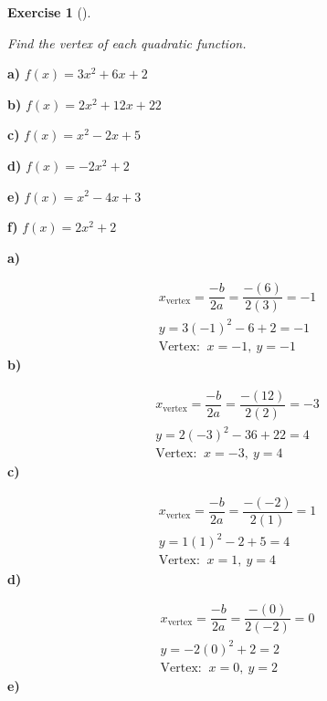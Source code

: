 \documentclass[
  letterpaper,
  DIV=11,
  numbers=noendperiod]{scrreprt}
\theoremstyle{definition}
\newtheorem{exercise}{Exercise}[chapter]
\theoremstyle{remark}
\begin{document}
\begin{exercise}[]\protect\hypertarget{exr-u7-25}{}\label{exr-u7-25}

\emph{Find the vertex of each quadratic function.}

\textbf{a)} \(\displaystyle f(x) = 3x^2 + 6x + 2\)

\textbf{b)} \(\displaystyle f(x) = 2x^2 + 12x + 22\)

\textbf{c)} \(\displaystyle f(x) = x^2 - 2x + 5\)

\textbf{d)} \(\displaystyle f(x) = -2x^2 + 2\)

\textbf{e)} \(\displaystyle f(x) = x^2 - 4x + 3\)

\textbf{f)} \(\displaystyle f(x) = 2x^2 + 2\)

\begin{tcolorbox}[enhanced jigsaw, opacitybacktitle=0.6, coltitle=black, arc=.35mm, colframe=quarto-callout-tip-color-frame, colback=white, bottomrule=.15mm, left=2mm, colbacktitle=quarto-callout-tip-color!10!white, titlerule=0mm, opacityback=0, title=\textcolor{quarto-callout-tip-color}{\faLightbulb}\hspace{0.5em}{🔍 View Solutions}, leftrule=.75mm, breakable, rightrule=.15mm, bottomtitle=1mm, toptitle=1mm, toprule=.15mm]

\textbf{a)}

\[
\begin{aligned}
x_{\text{vertex}} = \dfrac{-b}{2a} = \dfrac{-(6)}{2(3)} = -1 \\[4pt] y = 3(-1)^2 - 6 + 2 = -1 \\[4pt] \text{Vertex: }\ x=-1,\ y=-1
\end{aligned}
\] \textbf{b)}

\[
\begin{aligned}
x_{\text{vertex}} = \dfrac{-b}{2a} = \dfrac{-(12)}{2(2)} = -3 \\[4pt] y = 2(-3)^2 - 36 + 22 = 4 \\[4pt] \text{Vertex: }\ x=-3,\ y=4
\end{aligned}
\] \textbf{c)}

\[
\begin{aligned}
x_{\text{vertex}} = \dfrac{-b}{2a} = \dfrac{-(-2)}{2(1)} = 1 \\[4pt] y = 1(1)^2 - 2 + 5 = 4 \\[4pt] \text{Vertex: }\ x=1,\ y=4
\end{aligned}
\] \textbf{d)}

\[
\begin{aligned}
x_{\text{vertex}} = \dfrac{-b}{2a} = \dfrac{-(0)}{2(-2)} = 0 \\[4pt] y = -2(0)^2  + 2 = 2 \\[4pt] \text{Vertex: }\ x=0,\ y=2
\end{aligned}
\] \textbf{e)}


\end{tcolorbox}
\end{exercise}
\end{document}
